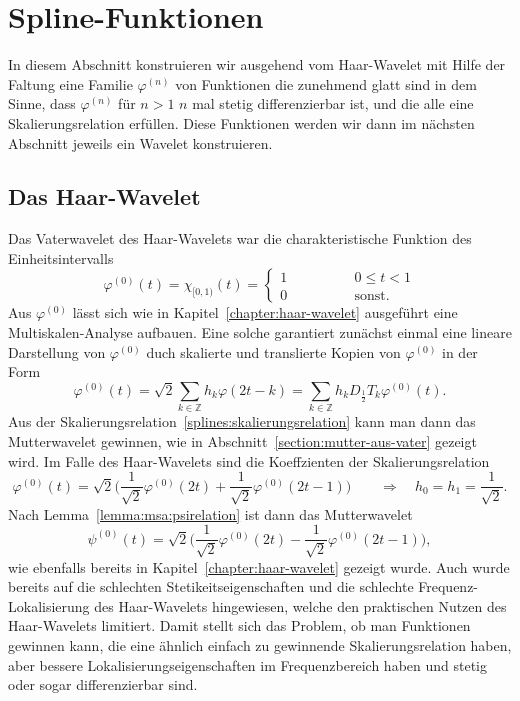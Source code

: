 %
%
%
\section{Spline-Funktionen
\label{section:spline-funktionen}}
In diesem Abschnitt konstruieren wir ausgehend vom Haar-Wavelet mit Hilfe
der Faltung eine Familie $\varphi^{(n)}$ von Funktionen die zunehmend glatt
sind in dem Sinne, dass $\varphi^{(n)}$ für $n>1$ $n$ mal stetig
differenzierbar ist, und die alle eine Skalierungsrelation erfüllen.
Diese Funktionen werden wir dann im nächsten Abschnitt jeweils ein
Wavelet konstruieren.

\subsection{Das Haar-Wavelet
\label{subsection:spline:haar}}
Das Vaterwavelet des Haar-Wavelets war die charakteristische Funktion
des Einheitsintervalls
\begin{equation}
\varphi^{(0)}(t)
=
\chi_{[0,1)}(t)
=
\begin{cases}
1\qquad\qquad&0\le t < 1\\
0\qquad\qquad&\text{sonst}.
\end{cases}
\end{equation}
Aus $\varphi^{(0)}$ lässt sich wie in Kapitel~\ref{chapter:haar-wavelet}
ausgeführt eine Multiskalen-Analyse aufbauen.
Eine solche garantiert zunächst einmal eine lineare Darstellung von
$\varphi^{(0)}$ duch skalierte und translierte Kopien von $\varphi^{(0)}$
in der Form
\begin{equation}
\varphi^{(0)}(t)
=
\sqrt{2}
\sum_{k\in\mathbb Z}
h_k\varphi(2t-k)
=
\sum_{k\in\mathbb Z}
h_k D_{\frac12}T_k\varphi^{(0)}(t).
\label{splines:skalierungsrelation}
\end{equation}
Aus der Skalierungsrelation~\eqref{splines:skalierungsrelation}
kann man dann das Mutterwavelet gewinnen, wie in
Abschnitt~\ref{section:mutter-aus-vater} gezeigt wird.
Im Falle des Haar-Wavelets sind die Koeffzienten der
Skalierungsrelation
\[
\varphi^{(0)}(t)
=
\sqrt{2}
\biggl(
\frac1{\sqrt{2}}
\varphi^{(0)}(2t)
+
\frac1{\sqrt{2}}
\varphi^{(0)}(2t-1)
\biggr)
\qquad
\Rightarrow
\quad
h_0 = h_1 = \frac{1}{\sqrt{2}}.
\]
Nach Lemma~\ref{lemma:msa:psirelation} ist dann das Mutterwavelet
\[
\psi^{(0)}(t)
=
\sqrt{2}
\biggl(
\frac{1}{\sqrt{2}}
\varphi^{(0)}(2t)
-
\frac{1}{\sqrt{2}}
\varphi^{(0)}(2t-1)
\biggr),
\]
wie ebenfalls bereits in Kapitel~\ref{chapter:haar-wavelet} gezeigt wurde.
Auch wurde bereits auf die schlechten Stetikeitseigenschaften und
die schlechte Frequenz-Lokalisierung des Haar-Wavelets hingewiesen,
welche den praktischen Nutzen des Haar-Wavelets limitiert.
Damit stellt sich das Problem, ob man Funktionen gewinnen kann, die
eine ähnlich einfach zu gewinnende Skalierungsrelation haben,
aber bessere Lokalisierungseigenschaften im Frequenzbereich haben und
stetig oder sogar differenzierbar sind.

